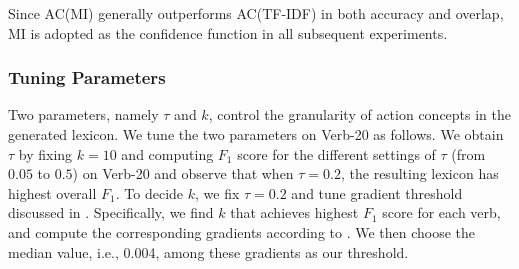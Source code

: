 Since AC(MI) generally outperforms AC(TF-IDF) in both accuracy and
overlap, MI is adopted as the confidence function in all subsequent experiments.


\subsubsection{Tuning Parameters}
Two parameters, namely $\tau$ and $k$, control the granularity of 
action concepts in the generated lexicon. We tune the two parameters 
on Verb-20 as follows. We obtain $\tau$ by fixing $k=10$ and computing
$F_1$ score for the different settings of $\tau$ (from $0.05$ to $0.5$)
on Verb-20 and observe that when $\tau=0.2$, the resulting 
lexicon has highest overall $F_1$. To decide $k$, we fix $\tau=0.2$ and 
tune gradient threshold discussed in . Specifically, we
find $k$ that achieves highest $F_1$ score for each verb, and 
compute the corresponding gradients according to . 
We then choose the median value, i.e., 0.004, among these gradients 
as our threshold.

